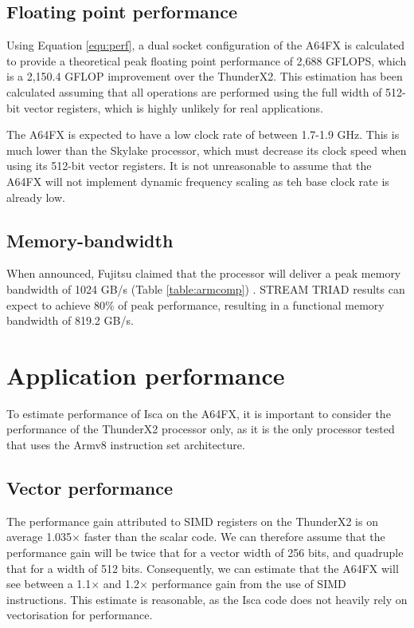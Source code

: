 \documentclass[a4paper,11pt]{report}
\begin{document}
\subsection{Floating point performance}
Using Equation \ref{equ:perf}, a dual socket configuration of the A64FX is calculated to provide a theoretical peak floating point performance of 2,688 GFLOPS, which is a 2,150.4 GFLOP improvement over the ThunderX2. This estimation has been calculated assuming that all operations are performed using the full width of 512-bit vector registers, which is highly unlikely for real applications. 
\par
The A64FX is expected to have a low clock rate of between 1.7-1.9 GHz. This is much lower than the Skylake processor, which must decrease its clock speed when using its 512-bit vector registers. It is not unreasonable to assume that the A64FX will not implement dynamic frequency scaling as teh base clock rate is already low. 

\subsection{Memory-bandwidth}
When announced, Fujitsu claimed that the processor will deliver a peak memory bandwidth of 1024 GB/s (Table \ref{table:armcomp}) \cite{yoshida2018fujitsu}. STREAM TRIAD results can expect to achieve 80\% of peak performance, resulting in a functional memory bandwidth of 819.2 GB/s. 

\section{Application performance}
To estimate performance of Isca on the A64FX, it is important to consider the performance of the ThunderX2 processor only, as it is the only processor tested that uses the Armv8 instruction set architecture.

\subsection{Vector performance}
The performance gain attributed to SIMD registers on the ThunderX2 is on average 1.035$\times$ faster than the scalar code. We can therefore assume that the performance gain will be twice that for a vector width of 256 bits, and quadruple that for a width of 512 bits. Consequently, we can estimate that the A64FX will see between a 1.1$\times$ and 1.2$\times$ performance gain from the use of SIMD instructions. This estimate is reasonable, as the Isca code does not heavily rely on vectorisation for performance. 
\end{document}
